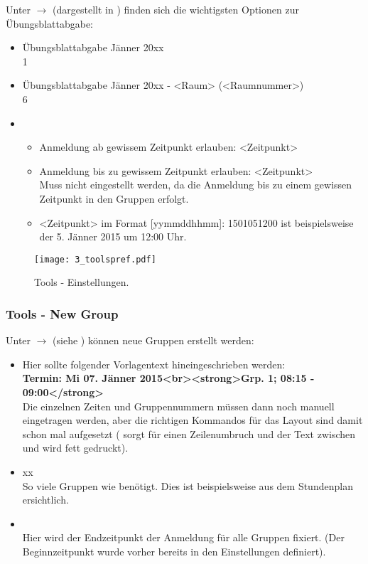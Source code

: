 Unter  $\to$  
(dargestellt in ) finden sich die wichtigsten Optionen zur
Übungsblattabgabe:
\begin{itemize}
\item {} Übungsblattabgabe Jänner 20xx\\
   1
\item {} Übungsblattabgabe Jänner 20xx - <Raum> (<Raumnummer>)\\
   6
\item {}
  \begin{itemize}
    \item  Anmeldung ab gewissem Zeitpunkt erlauben: 
       <Zeitpunkt>
    \item  Anmeldung bis zu gewissem Zeitpunkt erlauben: 
       <Zeitpunkt>\\
      Muss nicht eingestellt werden, da die Anmeldung bis zu einem gewissen
      Zeitpunkt in den Gruppen erfolgt.
    \item <Zeitpunkt> im Format [yymmddhhmm]: 1501051200 ist beispielsweise
      der 5. Jänner 2015 um 12:00 Uhr.
  \end{itemize}
\end{itemize}

\begin{figure}[htbp]
  \texttt{[image: 3\_toolspref.pdf]}
  \caption{ Tools - Einstellungen.}
  \label{fig:toolspref}
\end{figure}

\subsubsection{Tools - New Group}

Unter  $\to$  
(siehe ) können neue Gruppen erstellt werden:
\begin{itemize}
\item {} 
  Hier sollte folgender Vorlagentext hineingeschrieben werden:\\
  {\bf Termin: Mi 07. Jänner 2015<br><strong>Grp. 1; 08:15 - 09:00</strong>}\\
  Die einzelnen Zeiten und Gruppennummern müssen dann noch manuell eingetragen
  werden, aber die richtigen Kommandos für das Layout sind damit schon mal
  aufgesetzt ( sorgt für einen Zeilenumbruch und der Text
  zwischen  und  wird fett 
  gedruckt).
\item {} xx\\
  So viele Gruppen wie benötigt. Dies ist beispielsweise aus dem Stundenplan 
  ersichtlich.
\item {}\\
  Hier wird der Endzeitpunkt der Anmeldung für alle Gruppen fixiert. (Der
  Beginnzeitpunkt wurde vorher bereits in den Einstellungen definiert).  
\end{itemize}

